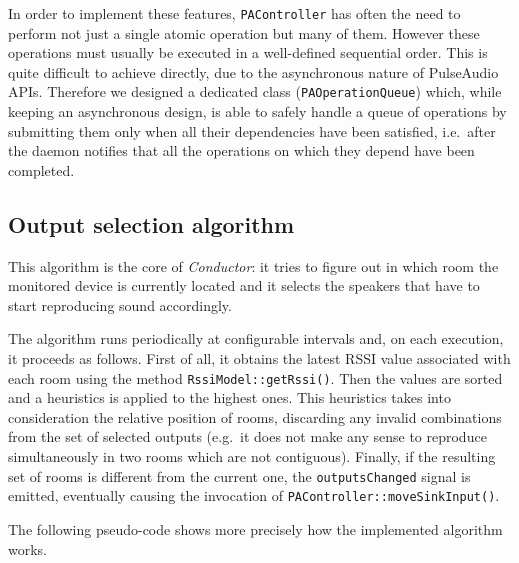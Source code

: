 \documentclass{IEEEtran}
\newcommand{\Conductor}{\textsl{Conductor}}
\begin{document}
In order to implement these features, \texttt{PAController} has often the need to perform not just a single atomic operation but many of them. However these operations must usually be executed in a well-defined sequential order. This is quite difficult to achieve directly, due to the asynchronous nature of PulseAudio APIs. Therefore we designed a dedicated class (\texttt{PAOperationQueue}) which, while keeping an asynchronous design, is able to safely handle a queue of operations by submitting them only when all their dependencies have been satisfied, i.e.\ after the daemon notifies that all the operations on which they depend have been completed.

\subsection{Output selection algorithm}
\label{algo}
This algorithm is the core of \Conductor{}: it tries to figure out in which room the monitored device is currently located and it selects the speakers that have to start reproducing sound accordingly.

The algorithm runs periodically at configurable intervals and, on each execution, it proceeds as follows. First of all, it obtains the latest RSSI value associated with each room using the method \texttt{RssiModel::getRssi()}. Then the values are sorted and a heuristics is applied to the highest ones. This heuristics takes into consideration the relative position of rooms, discarding any invalid combinations from the set of selected outputs (e.g.\ it does not make any sense to reproduce simultaneously in two rooms which are not contiguous). Finally, if the resulting set of rooms is different from the current one, the \texttt{outputsChanged} signal is emitted, eventually causing the invocation of \texttt{PAController::moveSinkInput()}.

The following pseudo-code shows more precisely how the implemented algorithm works.
\vspace{3mm}
\end{document}
